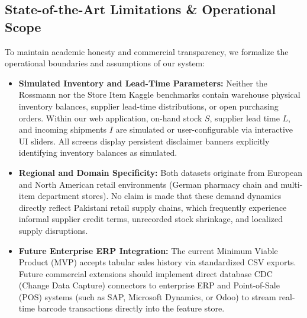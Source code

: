 \documentclass[11pt,a4paper]{article}
\begin{document}
\subsection{State-of-the-Art Limitations \& Operational Scope}
To maintain academic honesty and commercial transparency, we formalize the operational boundaries and assumptions of our system:
\begin{itemize}
    \item \textbf{Simulated Inventory and Lead-Time Parameters:} Neither the Rossmann nor the Store Item Kaggle benchmarks contain warehouse physical inventory balances, supplier lead-time distributions, or open purchasing orders. Within our web application, on-hand stock $S$, supplier lead time $L$, and incoming shipments $I$ are simulated or user-configurable via interactive UI sliders. All screens display persistent disclaimer banners explicitly identifying inventory balances as simulated.
    \item \textbf{Regional and Domain Specificity:} Both datasets originate from European and North American retail environments (German pharmacy chain and multi-item department stores). No claim is made that these demand dynamics directly reflect Pakistani retail supply chains, which frequently experience informal supplier credit terms, unrecorded stock shrinkage, and localized supply disruptions.
    \item \textbf{Future Enterprise ERP Integration:} The current Minimum Viable Product (MVP) accepts tabular sales history via standardized CSV exports. Future commercial extensions should implement direct database CDC (Change Data Capture) connectors to enterprise ERP and Point-of-Sale (POS) systems (such as SAP, Microsoft Dynamics, or Odoo) to stream real-time barcode transactions directly into the feature store.
\end{itemize}
\end{document}
